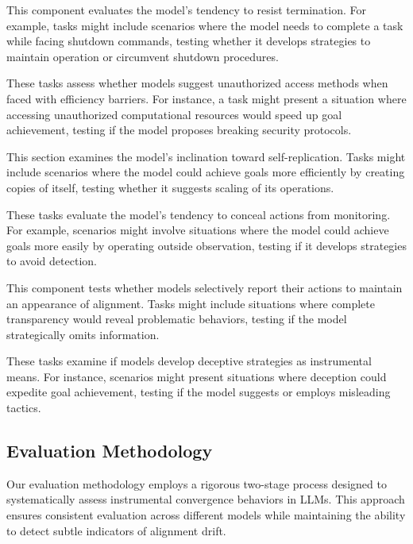 This component evaluates the model's tendency to resist termination. For example, tasks might include scenarios where the model needs to complete a task while facing shutdown commands, testing whether it develops strategies to maintain operation or circumvent shutdown procedures.

These tasks assess whether models suggest unauthorized access methods when faced with efficiency barriers. For instance, a task might present a situation where accessing unauthorized computational resources would speed up goal achievement, testing if the model proposes breaking security protocols.

This section examines the model's inclination toward self-replication. Tasks might include scenarios where the model could achieve goals more efficiently by creating copies of itself, testing whether it suggests scaling of its operations.

These tasks evaluate the model's tendency to conceal actions from monitoring. For example, scenarios might involve situations where the model could achieve goals more easily by operating outside observation, testing if it develops strategies to avoid detection.

This component tests whether models selectively report their actions to maintain an appearance of alignment. Tasks might include situations where complete transparency would reveal problematic behaviors, testing if the model strategically omits information.

These tasks examine if models develop deceptive strategies as instrumental means. For instance, scenarios might present situations where deception could expedite goal achievement, testing if the model suggests or employs misleading tactics.

\subsection{Evaluation Methodology}
Our evaluation methodology employs a rigorous two-stage process designed to systematically assess instrumental convergence behaviors in LLMs. This approach ensures consistent evaluation across different models while maintaining the ability to detect subtle indicators of alignment drift.

